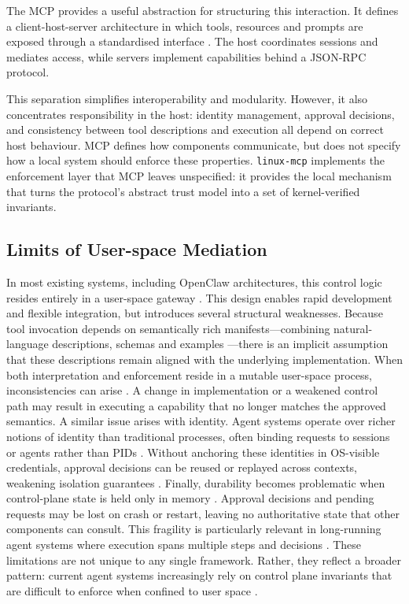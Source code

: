 The MCP provides a useful abstraction for structuring this interaction. 
It defines a client-host-server architecture in which tools, resources and prompts are exposed through a standardised interface \cite{mcp2025}.
The host coordinates sessions and mediates access, while servers implement capabilities behind a JSON-RPC protocol.

This separation simplifies interoperability and modularity. 
However, it also concentrates responsibility in the host: identity management, approval decisions, and consistency between tool descriptions and execution all depend on correct host behaviour.
MCP defines how components communicate, but does not specify how a local system should enforce these properties.
\texttt{linux-mcp} implements the enforcement layer that MCP leaves unspecified: it provides the local mechanism that turns the protocol's abstract trust model into a set of kernel-verified invariants.

\subsection{Limits of User-space Mediation}

In most existing systems, including OpenClaw architectures, this control logic resides entirely in a user-space gateway \cite{langchain2022, autogpt2023}.
This design enables rapid development and flexible integration, but introduces several structural weaknesses.
Because tool invocation depends on semantically rich manifests---combining natural-language descriptions, schemas and examples \cite{schick2023toolformer, patil2023gorilla, mcp2025}---there is an implicit assumption that these descriptions remain aligned with the underlying implementation.
When both interpretation and enforcement reside in a mutable user-space process, inconsistencies can arise \cite{liu2023prompt}.
A change in implementation or a weakened control path may result in executing a capability that no longer matches the approved semantics.
A similar issue arises with identity.
Agent systems operate over richer notions of identity than traditional processes, often binding requests to sessions or agents rather than PIDs \cite{yao2023react, autogpt2023, park2023generative}.
Without anchoring these identities in OS-visible credentials, approval decisions can be reused or replayed across contexts, weakening isolation
guarantees \cite{greshake2023prompt}.
Finally, durability becomes problematic when control-plane state is held only in memory \cite{packer2024memgpt}.
Approval decisions and pending requests may be lost on crash or restart, leaving no authoritative state that other components can consult.
This fragility is particularly relevant in long-running agent systems where execution spans multiple steps and decisions \cite{wang2023voyager, yang2024swe}.
These limitations are not unique to any single framework.
Rather, they reflect a broader pattern: current agent systems increasingly rely on control plane invariants \cite{anderson1972computer} that are difficult to enforce when confined to user space \cite{garfinkel2003terra, watson2010capsicum, ji2026seagent, shi2025progent}.

